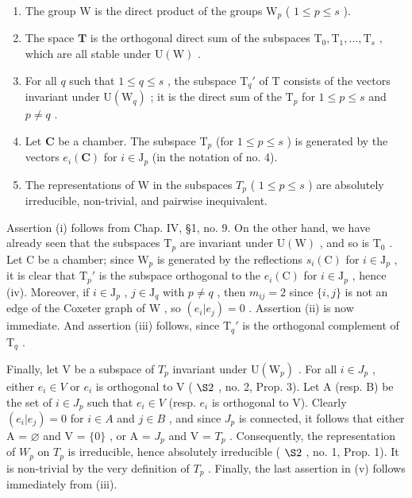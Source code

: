 \begin{enumerate}
\def\labelenumi{(\roman{enumi})}
\item
  The group W is the direct product of the groups \(\mathrm{W}_p\) ( \(1 \leqslant p \leqslant s\) ).
\item
  The space \(\mathbf{T}\) is the orthogonal direct sum of the subspaces \(\mathrm{T}_0, \mathrm{T}_1, \ldots, \mathrm{T}_s\) , which are all stable under \(\mathrm{U}(\mathrm{W})\) .
\item
  For all \(q\) such that \(1 \leqslant q \leqslant s\) , the subspace \(\mathrm{T}_q'\) of \(\mathrm{T}\) consists of the vectors invariant under \(\mathrm{U}(\mathrm{W}_q)\) ; it is the direct sum of the \(\mathrm{T}_p\) for \(1 \leqslant p \leqslant s\) and \(p \neq q\) .
\item
  Let \(\mathbf{C}\) be a chamber. The subspace \(\mathrm{T}_p\) (for \(1 \leqslant p \leqslant s\) ) is generated by the vectors \(e_i(\mathbf{C})\) for \(i \in \mathrm{J}_p\) (in the notation of no. 4).
\item
  The representations of W in the subspaces \(T_{p}\) ( \(1 \leqslant p \leqslant s\) ) are absolutely irreducible, non-trivial, and pairwise inequivalent.
\end{enumerate}

Assertion (i) follows from Chap. IV, §1, no. 9. On the other hand, we have already seen that the subspaces \(\mathrm{T}_p\) are invariant under \(\mathrm{U}(\mathrm{W})\) , and so is \(\mathrm{T}_0\) . Let \(\mathrm{C}\) be a chamber; since \(\mathrm{W}_p\) is generated by the reflections \(s_i(\mathrm{C})\) for \(i \in \mathrm{J}_p\) , it is clear that \(\mathrm{T}_p'\) is the subspace orthogonal to the \(e_i(\mathrm{C})\) for \(i \in \mathrm{J}_p\) , hence (iv). Moreover, if \(i \in \mathrm{J}_p\) , \(j \in \mathrm{J}_q\) with \(p \neq q\) , then \(m_{ij} = 2\) since \(\{i,j\}\) is not an edge of the Coxeter graph of \(\mathrm{W}\) , so \((e_i|e_j) = 0\) . Assertion (ii) is now immediate. And assertion (iii) follows, since \(\mathrm{T}_q'\) is the orthogonal complement of \(\mathrm{T}_q\) .

Finally, let V be a subspace of \(T_{p}\) invariant under \(\mathrm{U}(\mathrm{W}_{p})\) . For all \(i \in J_{p}\) , either \(e_{i} \in V\) or \(e_{i}\) is orthogonal to V ( \(\S2\) , no. 2, Prop. 3). Let A (resp. B) be the set of \(i \in J_{p}\) such that \(e_{i} \in V\) (resp. \(e_{i}\) is orthogonal to V). Clearly \((e_{i}|e_{j}) = 0\) for \(i \in A\) and \(j \in B\) , and since \(J_{p}\) is connected, it follows that either A = \(\varnothing\) and V = \(\{0\}\) , or A = \(J_{p}\) and V = \(T_{p}\) . Consequently, the representation of \(W_{p}\) on \(T_{p}\) is irreducible, hence absolutely irreducible ( \(\S2\) , no. 1, Prop. 1). It is non-trivial by the very definition of \(T_{p}\) . Finally, the last assertion in (v) follows immediately from (iii).

